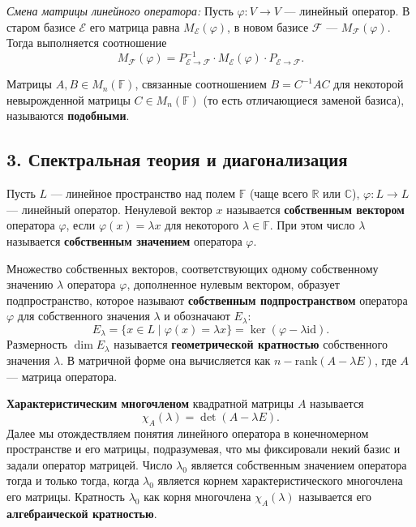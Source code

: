 \vspace{1em}
\textit{Смена матрицы линейного оператора:} Пусть $\varphi : V \to V$ — линейный оператор. В старом базисе $\mathcal{E}$ его матрица равна $M_\mathcal{E}(\varphi)$, в новом базисе $\mathcal{F}$ — $M_\mathcal{F}(\varphi)$. Тогда выполняется соотношение
\[
M_\mathcal{F}(\varphi) = P_{\mathcal{E} \to \mathcal{F}}^{-1} \cdot M_\mathcal{E}(\varphi) \cdot P_{\mathcal{E} \to \mathcal{F}}.
\]

Матрицы $A, B \in M_n(\mathbb{F})$, связанные соотношением $B = C^{-1}AC$ для некоторой невырожденной матрицы $C \in M_n(\mathbb{F})$ (то есть отличающиеся заменой базиса), называются \textbf{подобными}.

\subsection*{3. Спектральная теория и диагонализация}

\begin{definition}
Пусть $L$ — линейное пространство над полем $\mathbb{F}$ (чаще всего $\mathbb{R}$ или $\mathbb{C}$), $\varphi : L \to L$ — линейный оператор. Ненулевой вектор $x$ называется \textbf{собственным вектором} оператора $\varphi$, если $\varphi(x) = \lambda x$ для некоторого $\lambda \in \mathbb{F}$. При этом число $\lambda$ называется \textbf{собственным значением} оператора $\varphi$.
\end{definition}

\begin{definition}
Множество собственных векторов, соответствующих одному собственному значению $\lambda$ оператора $\varphi$, дополненное нулевым вектором, образует подпространство, которое называют \textbf{собственным подпространством} оператора $\varphi$ для собственного значения $\lambda$ и обозначают $E_\lambda$:
\[
E_\lambda = \{x \in L \mid \varphi(x) = \lambda x\} = \ker(\varphi - \lambda \mathrm{id}).
\]
Размерность $\dim E_\lambda$ называется \textbf{геометрической кратностью} собственного значения $\lambda$. В матричной форме она вычисляется как $n - \mathrm{rank}(A - \lambda E)$, где $A$ — матрица оператора.
\end{definition}

\begin{definition}
\textbf{Характеристическим многочленом} квадратной матрицы $A$ называется
\[
\chi_A(\lambda) = \det(A - \lambda E).
\]
Далее мы отождествляем понятия линейного оператора в конечномерном пространстве и его матрицы, подразумевая, что мы фиксировали некий базис и задали оператор матрицей. Число $\lambda_0$ является собственным значением оператора тогда и только тогда, когда $\lambda_0$ является корнем характеристического многочлена его матрицы. Кратность $\lambda_0$ как корня многочлена $\chi_A(\lambda)$ называется его \textbf{алгебраической кратностью}.
\end{definition}

